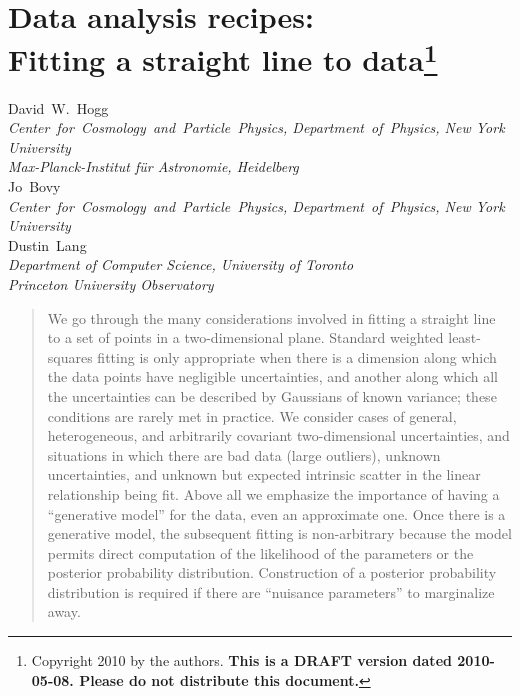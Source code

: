 \documentclass[12pt,twoside]{article}
\newcommand{\affil}[1]{{\footnotesize\textsl{#1}}}
\begin{document}
\thispagestyle{plain}\raggedbottom
\section*{Data analysis recipes:\ \\
  Fitting a straight line to data\footnote{
    Copyright 2010 by the authors.
    \textbf{This is a DRAFT version dated 2010-05-08.
    Please do not distribute this document.}}}

\noindent
David~W.~Hogg\\
\affil{Center~for~Cosmology~and~Particle~Physics, Department~of~Physics, New York University}\\
\affil{Max-Planck-Institut f\"ur Astronomie, Heidelberg}
\\[1ex]
Jo~Bovy\\
\affil{Center~for~Cosmology~and~Particle~Physics, Department~of~Physics, New York University}
\\[1ex]
Dustin~Lang\\
\affil{Department of Computer Science, University of Toronto}\\
\affil{Princeton University Observatory}

\begin{abstract}
  We go through the many considerations involved in fitting a straight
  line to a set of points in a two-dimensional plane.  Standard
  weighted least-squares fitting is only appropriate when there is a
  dimension along which the data points have negligible uncertainties,
  and another along which all the uncertainties can be described by
  Gaussians of known variance; these conditions are rarely met in
  practice.  We consider cases of general, heterogeneous, and
  arbitrarily covariant two-dimensional uncertainties, and situations
  in which there are bad data (large outliers), unknown uncertainties,
  and unknown but expected intrinsic scatter in the linear
  relationship being fit.  Above all we emphasize the importance of
  having a ``generative model'' for the data, even an approximate one.
  Once there is a generative model, the subsequent fitting is
  non-arbitrary because the model permits direct computation of the
  likelihood of the parameters or the posterior probability
  distribution.  Construction of a posterior probability distribution
  is required if there are ``nuisance parameters'' to marginalize
  away.
\end{abstract}
\end{document}
